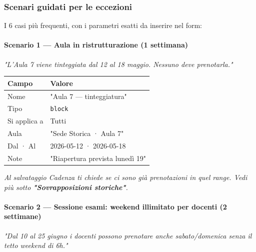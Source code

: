 \documentclass[11pt,a4paper]{article}
\renewenvironment{quote}
  {\begin{list}{}{%
      \setlength{\leftmargin}{8pt}%
      \setlength{\rightmargin}{8pt}%
      \setlength{\topsep}{6pt}%
      \setlength{\parsep}{0pt}}%
      \item\relax\color{black!75}\itshape}
  {\end{list}}
\begin{document}
\subsubsection{Scenari guidati per le eccezioni}


I 6 casi più frequenti, con i parametri esatti da inserire nel form:

\paragraph{Scenario 1 --- Aula in ristrutturazione (1 settimana)}


\begin{quote}
\textit{"L'Aula 7 viene tinteggiata dal 12 al 18 maggio. Nessuno deve prenotarla."}
\end{quote}

\begin{table}[H]
\centering
\small
\begin{tabularx}{\linewidth}{|X|X|}
\hline
\rowcolor{tableheader} Campo & Valore \\
\hline
Nome & "Aula 7 --- tinteggiatura" \\
\hline
Tipo & \texttt{block} \\
\hline
Si applica a & Tutti \\
\hline
Aula & "Sede Storica · Aula 7" \\
\hline
Dal · Al & 2026-05-12 · 2026-05-18 \\
\hline
Note & "Riapertura prevista lunedì 19" \\
\hline
\end{tabularx}
\end{table}


\begin{quote}
Al salvataggio Cadenza ti chiede se ci sono già prenotazioni in quel range. Vedi più sotto \textbf{"Sovrapposizioni storiche"}.
\end{quote}

\paragraph{Scenario 2 --- Sessione esami: weekend illimitato per docenti (2 settimane)}


\begin{quote}
\textit{"Dal 10 al 25 giugno i docenti possono prenotare anche sabato/domenica senza il tetto weekend di 6h."}
\end{quote}
\end{document}
